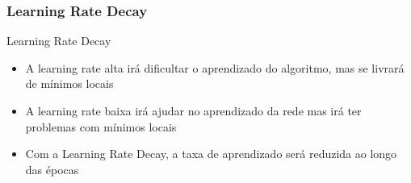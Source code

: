 \documentclass{beamer}
\begin{document}
	
\begin{frame}
	\frametitle{Learning Rate Decay}
	\begin{block}{Learning Rate Decay}
		\begin{itemize}
			\item A learning rate alta irá dificultar o aprendizado do algoritmo, mas se livrará de mínimos locais
			\item A learning rate baixa irá ajudar no aprendizado da rede mas irá ter problemas com mínimos locais
			\item Com a Learning Rate Decay, a taxa de aprendizado será reduzida ao longo das épocas
		\end{itemize}
	\end{block}
\end{frame}	
\end{document}
